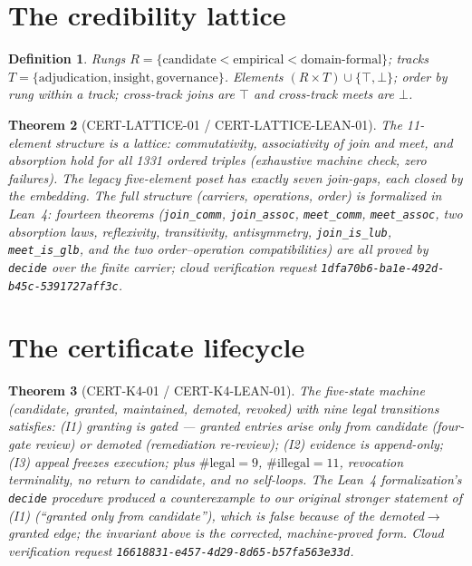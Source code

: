 \documentclass[11pt]{article}
\newtheorem{theorem}{Theorem}
\newtheorem{definition}[theorem]{Definition}
\begin{document}
\section{The credibility lattice}
\begin{definition}
Rungs $R=\{\text{candidate}<\text{empirical}<\text{domain-formal}\}$;
tracks $T=\{\text{adjudication},\text{insight},\text{governance}\}$.
Elements $(R\times T)\cup\{\top,\bot\}$; order by rung within a track;
cross-track joins are $\top$ and cross-track meets are $\bot$.
\end{definition}
\begin{theorem}[CERT-LATTICE-01 / CERT-LATTICE-LEAN-01]
The 11-element structure is a lattice: commutativity, associativity of join
and meet, and absorption hold for all 1331 ordered triples (exhaustive
machine check, zero failures). The legacy five-element poset has exactly
seven join-gaps, each closed by the embedding. The full structure (carriers,
operations, order) is formalized in Lean~4: fourteen theorems
(\texttt{join\_comm}, \texttt{join\_assoc}, \texttt{meet\_comm},
\texttt{meet\_assoc}, two absorption laws, reflexivity, transitivity,
antisymmetry, \texttt{join\_is\_lub}, \texttt{meet\_is\_glb}, and the two
order--operation compatibilities) are all proved by \texttt{decide} over the
finite carrier; cloud verification request
\texttt{1dfa70b6-ba1e-492d-b45c-5391727aff3c}.
\end{theorem}

\section{The certificate lifecycle}
\begin{theorem}[CERT-K4-01 / CERT-K4-LEAN-01]
The five-state machine (candidate, granted, maintained, demoted, revoked)
with nine legal transitions satisfies: (I1) granting is gated ---
\emph{granted} entries arise only from \emph{candidate} (four-gate review)
or \emph{demoted} (remediation re-review); (I2) evidence is append-only;
(I3) appeal freezes execution; plus $\#\text{legal}=9$,
$\#\text{illegal}=11$, revocation terminality, no return to candidate, and
no self-loops. The Lean~4 formalization's \texttt{decide} procedure produced
a counterexample to our original stronger statement of (I1) (``granted only
from candidate''), which is false because of the demoted$\to$granted edge;
the invariant above is the corrected, machine-proved form. Cloud
verification request \texttt{16618831-e457-4d29-8d65-b57fa563e33d}.
\end{theorem}
\end{document}
